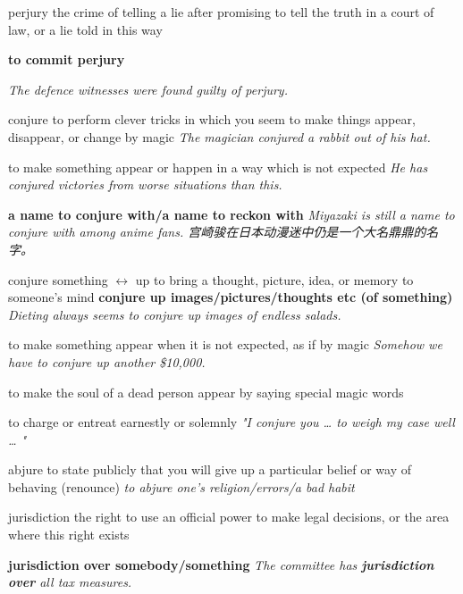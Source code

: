 \begin{DefWord}{perjury}
    the crime of telling a lie after promising to tell the truth in a court of law, or a lie told in this way

    \textbf{to commit perjury}

    \textit{The defence witnesses were found guilty of perjury.}
\end{DefWord}


\begin{DefWord}{conjure}
    to perform clever tricks in which you seem to make things appear, disappear, or change by magic
    \textit{The magician conjured a rabbit out of his hat.}

    to make something appear or happen in a way which is not expected
    \textit{He has conjured victories from worse situations than this.}

    \textbf{a name to conjure with/a name to reckon with}
    \textit{Miyazaki is still a name to conjure with among anime fans. 宫崎骏在日本动漫迷中仍是一个大名鼎鼎的名字。}

    conjure something $\leftrightarrow$ up
    to bring a thought, picture, idea, or memory to someone's mind
    \textbf{conjure up images/pictures/thoughts etc (of something)}
    \textit{Dieting always seems to conjure up images of endless salads.}

    to make something appear when it is not expected, as if by magic
    \textit{Somehow we have to conjure up another \$10,000.}

    to make the soul of a dead person appear by saying special magic words

    to charge or entreat earnestly or solemnly
    \textit{"I conjure you … to weigh my case well … "}
\end{DefWord}

\begin{DefWord}{abjure}
    to state publicly that you will give up a particular belief or way of behaving (renounce)
    \textit{to abjure one's religion/errors/a bad habit}
\end{DefWord}


\begin{DefWord}{jurisdiction}
    the right to use an official power to make legal decisions, or the area where this right exists

    \textbf{jurisdiction over somebody/something}
    \textit{The committee has \textbf{jurisdiction over} all tax measures.}

\end{DefWord}




